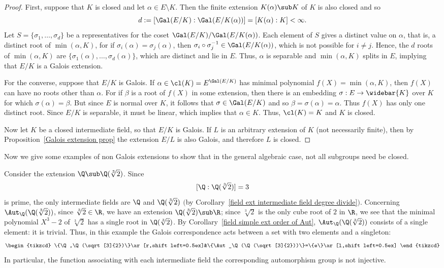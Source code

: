 \begin{proof}
First, suppose that $K$ is closed and let $\alpha\in E\setminus K$. Then the finite extension $K(\alpha)\sub K$ of $K$ is also closed and so
\[d:=[\Gal(E/K):\Gal(E/K(\alpha))]=[K(\alpha):K]<\infty.\]
Let $S=\{\sigma_1,\dots,\sigma_d\}$ be a representatives for the coset $\Gal(E/K)/\Gal(E/K(\alpha))$. Each element of $S$ gives a distinct value on $\alpha$, that is, a distinct root of $\min(\alpha,K)$, for if $\sigma_i(\alpha)=\sigma_j(\alpha)$, then $\sigma_i\circ\sigma_j^{-1}\in\Gal(E/K(\alpha))$, which is not possible for $i\neq j$. Hence, the $d$ roots of $\min(\alpha,K)$ are $\{\sigma_1(\alpha),\dots,\sigma_d(\alpha)\}$, which are distinct and lie in $E$. Thus, $\alpha$ is separable and $\min(\alpha,K)$ splits in $E$, implying that $E/K$ is a Galois extension.\par
For the converse, suppose that $E/K$ is Galois. If $\alpha\in\cl(K)=E^{\Gal(E/K)}$ has minimal polynomial $f(X)=\min(\alpha,K)$, then $f(X)$ can have no roots other than $\alpha$. For if $\beta$ is a root of $f(X)$ in some extension, then there is an embedding $\sigma:E\to\widebar{K}$ over $K$ for which $\sigma(\alpha)=\beta$. But since $E$ is normal over $K$, it follows that $\sigma\in\Gal(E/K)$ and so $\beta=\sigma(\alpha)=\alpha$. Thus $f(X)$ has only one distinct root. Since $E/K$ is separable, it must be linear, which implies that $\alpha\in K$. Thus, $\cl(K)=K$ and $K$ is closed.\par
Now let $K$ be a closed intermediate field, so that $E/K$ is Galois. If $L$ is an arbitrary extension of $K$ (not necessarily finite), then by Proposition~\ref{Galois extension prop} the extension $E/L$ is also Galois, and therefore $L$ is closed.
\end{proof}
Now we give some examples of non Galois extensions to show that in the general algebraic case, not all subgroups need be closed.
\begin{example}\label{field ext no Galois eg}
Consider the extension $\Q\sub\Q(\sqrt[3]{2})$. Since
\[[\Q:\Q(\sqrt[3]{2})]=3\]
is prime, the only intermediate fields are $\Q$ and $\Q(\sqrt[3]{2})$ $($by Corollary~\ref{field ext intermediate field degree divide}$)$. Concerning $\Aut_\Q(\Q(\sqrt[3]{2}))$, since $\sqrt[3]{2}\in\R$, we have an extension $\Q(\sqrt[3]{2})\sub\R$; since $\sqrt[3]{2}$ is the only cube root of $2$ in $\R$, we see that the minimal polynomial $X^3-2$ of $\sqrt[3]{2}$ has a single root in $\Q(\sqrt[3]{2})$. By Corollary~\ref{field simple ext order of Aut}, $\Aut_\Q(\Q(\sqrt[3]{2}))$ consists of a single element: it is trivial. Thus, in this example the Galois correspondence acts between a set with two elements and a singleton:
\[\begin{tikzcd}
\{\Q,\Q(\sqrt[3]{2})\}\ar[r,shift left=0.5ex]&\{\Aut_\Q(\Q(\sqrt[3]{2}))\}=\{e\}\ar[l,shift left=0.5ex]
\end{tikzcd}\]
In particular, the function associating with each intermediate field the corresponding automorphism group is not injective.
\end{example}
